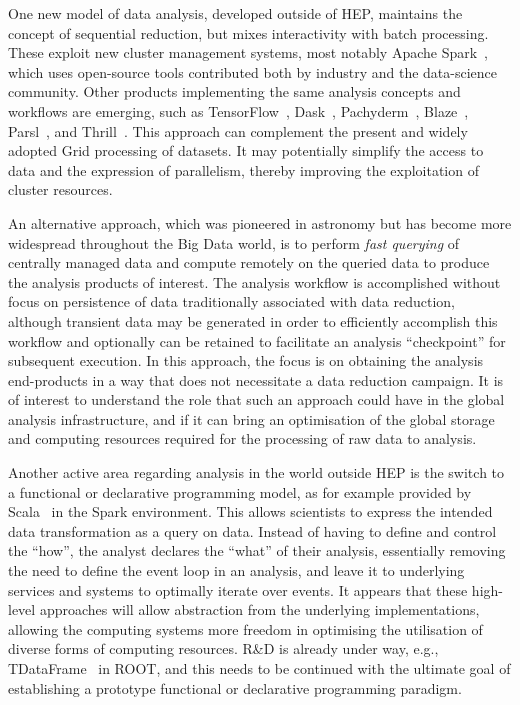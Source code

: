 One new model of data analysis, developed outside of HEP, maintains the
concept of sequential reduction, but mixes interactivity with
batch processing. These exploit new cluster management systems, most
notably Apache Spark~\cite{Spark}, which uses open-source tools contributed both by
industry and the data-science community. Other products implementing the
same analysis concepts and workflows are emerging, such as
TensorFlow~\cite{abadi2016tensorflow}, Dask~\cite{rocklin2015dask}, Pachyderm~\cite{thepachydermteam}, Blaze~\cite{wiebe2014blaze}, Parsl~\cite{babuji_yadu_2017_853492}, and Thrill~\cite{bingmann2016thrill}.
This approach can complement the present and widely adopted Grid processing of datasets. It may
potentially simplify the access to data and the expression of
parallelism, thereby improving the exploitation of cluster resources.

An alternative approach, which was pioneered in astronomy but has become
more widespread throughout the Big Data world, is to perform \emph{fast
querying} of centrally managed data and compute remotely on the queried
data to produce the analysis products of interest. The analysis workflow
is accomplished without focus on persistence of data traditionally
associated with data reduction, although transient data may be generated
in order to efficiently accomplish this workflow and optionally can be
retained to facilitate an analysis ``checkpoint'' for subsequent
execution. In this approach, the focus is on obtaining the analysis
end-products in a way that does not necessitate a data reduction
campaign. It is of interest to understand the role
that such an approach could have in the global analysis infrastructure,
and if it can bring an optimisation of the global storage and computing
resources required for the processing of raw data to analysis.

Another active area regarding analysis in the world outside HEP is the
switch to a functional or declarative programming model, as for example
provided by Scala~\cite{Scala} in the Spark environment. This allows scientists to
express the intended data transformation as a query on data. Instead of
having to define and control the ``how'', the analyst declares the
``what'' of their analysis, essentially removing the need to define the
event loop in an analysis, and leave it to underlying services and
systems to optimally iterate over events. It appears that these
high-level approaches will allow abstraction from the underlying
implementations, allowing the computing systems more freedom in
optimising the utilisation of diverse forms of computing resources. R\&D
is already under way, e.g., TDataFrame~\cite{TDataFrame} in ROOT, and
this needs to be continued with the ultimate goal of establishing a
prototype functional or declarative programming paradigm.

